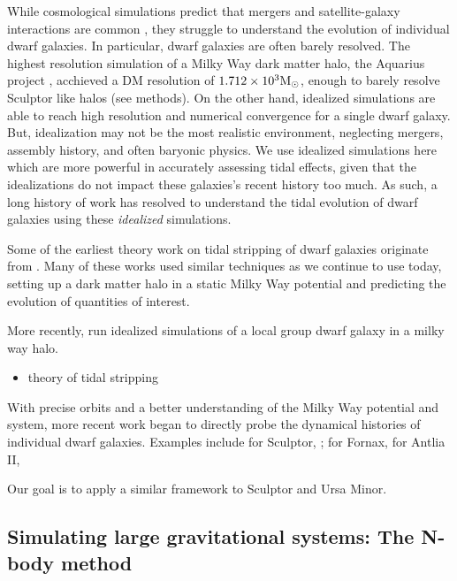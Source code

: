 While cosmological simulations predict that mergers and satellite-galaxy
interactions are common \citep[e.g.,][]{riley+2024}, they struggle to
understand the evolution of individual dwarf galaxies. In particular,
dwarf galaxies are often barely resolved. The highest resolution
simulation of a Milky Way dark matter halo, the Aquarius project
\citep{springel+2008}, acchieved a DM resolution of
\(1.712 \times10^3 {\rm M}_{\odot}\), enough to barely resolve Sculptor like halos
(see methods). On the other hand, idealized simulations are able to
reach high resolution and numerical convergence for a single dwarf
galaxy. But, idealization may not be the most realistic environment,
neglecting mergers, assembly history, and often baryonic physics. We use
idealized simulations here which are more powerful in accurately
assessing tidal effects, given that the idealizations do not impact
these galaxies's recent history too much. As such, a long history of
work has resolved to understand the tidal evolution of dwarf galaxies
using these \emph{idealized} simulations.

Some of the earliest theory work on tidal stripping of dwarf galaxies
originate from \citep[\citet{moore+davis1994},
\citet{johnston+spergel+hernquist1995}, \citet{oh+lin+aarseth1995},
\citet{piatek+pryor1995}, \citet{velazquez+white1995},
\citet{kroupa1997}]{allen+richstone1988}. Many of these works used
similar techniques as we continue to use today, setting up a dark matter
halo in a static Milky Way potential and predicting the evolution of
quantities of interest.

More recently, \citet{PNM2008} run idealized simulations of a local
group dwarf galaxy in a milky way halo.

\begin{itemize}
\tightlist
\item
  \citet{mayer+2001} theory of tidal stripping
\end{itemize}

With precise orbits and a better understanding of the Milky Way
potential and system, more recent work began to directly probe the
dynamical histories of individual dwarf galaxies. Examples include
\citet{iorio+2019} for Sculptor, \citet{borukhovetskaya+2022};
\citet{dicintio+2024} for Fornax, \citet{borukhovetskaya+2022a} for
Antlia II,

Our goal is to apply a similar framework to Sculptor and Ursa Minor.

\subsection{Simulating large gravitational systems: The N-body
method}\label{simulating-large-gravitational-systems-the-n-body-method}

